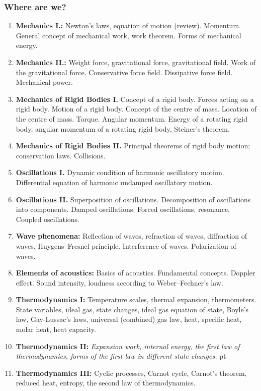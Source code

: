 \documentclass[t,aspectratio=169]{beamer}
\begin{document}
\begin{frame}
\frametitle{Where are we?}
\begin{enumerate}
\setlength{\parskip}{0pt}
\setlength{\itemsep}{0pt}
\item \textbf{Mechanics I.:} Newton’s laws, equation of motion (review). Momentum. General concept of mechanical work, work theorem. Forms of mechanical energy.
\item \textbf{Mechanics II.:} Weight force, gravitational force, gravitational field. Work of the gravitational force. Conservative force field. Dissipative force field. Mechanical power.
\item \textbf{Mechanics of Rigid Bodies I.} Concept of a rigid body. Forces acting on a rigid body. Motion of a rigid body. Concept of the centre of mass. Location of the centre of mass. Torque. Angular momentum. Energy of a rotating rigid body, angular momentum of a rotating rigid body, Steiner’s theorem.
\item \textbf{Mechanics of Rigid Bodies II.} Principal theorems of rigid body motion; conservation laws. Collisions.
\item \textbf{Oscillations I.} Dynamic condition of harmonic oscillatory motion. Differential equation of harmonic undamped oscillatory motion.
\pagebreak
\item \textbf{Oscillations II.} Superposition of oscillations. Decomposition of oscillations into components. Damped oscillations. Forced oscillations, resonance. Coupled oscillations.
\item \textbf{Wave phenomena:} Reflection of waves, refraction of waves, diffraction of waves. Huygens–Fresnel principle. Interference of waves. Polarization of waves.
\item \textbf{Elements of acoustics:} Basics of acoustics. Fundamental concepts. Doppler effect. Sound intensity, loudness according to Weber–Fechner’s law.
\item \textbf{Thermodynamics I:} Temperature scales, thermal expansion, thermometers. State variables, ideal gas, state changes, ideal gas equation of state, Boyle’s law, Gay-Lussac’s laws, universal (combined) gas law, heat, specific heat, molar heat, heat capacity.
\item \textbf{Thermodynamics II:} \textit{Expansion work, internal energy, the first law of thermodynamics, forms of the first law in different state changes.}
\pagebreak
{} pt
\item \textbf{Thermodynamics III:} Cyclic processes, Carnot cycle, Carnot’s theorem, reduced heat, entropy, the second law of thermodynamics.

\end{enumerate}
\end{frame}
\end{document}
